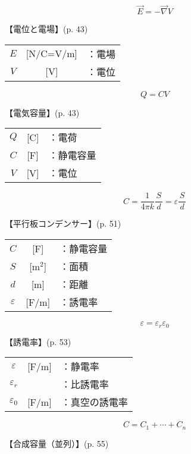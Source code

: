 \documentclass[10pt]{jarticle}
\begin{document}
\newpage
\[
\vec{E} = - \vec{\nabla} V
\]


\vskip3mm
【電位と電場】{\footnotesize (p. 43)}

\begin{tabular}{ccl}
$E$	&[N/C=V/m]	&：電場 \\
$V$	&[V]	&：電位
\end{tabular}





\newpage
\[
Q = C V
\]


\vskip3mm
【電気容量】{\footnotesize (p. 43)}

\begin{tabular}{ccl}
$Q$	&[C]	&：電荷 \\
$C$	&[F]	&：静電容量 \\
$V$	&[V]	&：電位
\end{tabular}





\newpage
\[
C = \frac{1}{4\pi k} \frac{S}{\, d \,} = \varepsilon \frac{S}{\, d \,}
\]


\vskip3mm
【平行板コンデンサー】{\footnotesize (p. 51)}

\begin{tabular}{ccl}
$C$	&[F]	&：静電容量 \\
$S$	&[m$^2$]	&：面積 \\
$d$	&[m]	&：距離 \\
$\varepsilon$	&[F/m]	&：誘電率
\end{tabular}




\newpage
\[
\varepsilon = \varepsilon_r \varepsilon_0
\]


\vskip3mm
【誘電率】{\footnotesize (p. 53)}

\begin{tabular}{ccl}
$\varepsilon$	&[F/m]	&：静電率 \\
$\varepsilon_r$	&	&：比誘電率\\
$\varepsilon_0$	&[F/m]	&：真空の誘電率
\end{tabular}






\newpage
\[
C = C_1 + \cdots + C_n
\]


\vskip3mm
【合成容量（並列）】{\footnotesize (p. 55)}
\end{document}
